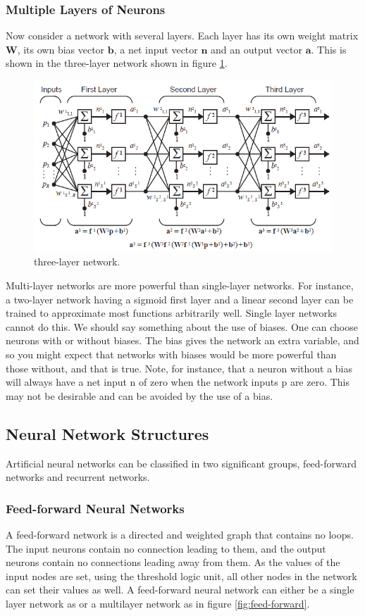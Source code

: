 \documentclass[12pt, a4paper, twoside]{report}
\begin{document}
\subsubsection{Multiple Layers of Neurons}
Now consider a network with several layers. Each layer has its own weight matrix $\mathbf{W}$, its own bias vector $\mathbf{b}$, a net input vector $\mathbf{n}$ and an output vector $\mathbf{a}$. This is shown in the three-layer network shown in figure \ref{fig:three_layer_network}.
\begin{figure}[!h]
	\centering
	\includegraphics[width=1\textwidth]
	{images/chapter4/three_layer_network}
	\caption{three-layer network.}
	\label{fig:three_layer_network}
\end{figure}

Multi-layer networks are more powerful than single-layer networks. For instance, a two-layer network having a sigmoid first layer and a linear second layer can be trained to approximate most functions arbitrarily well. Single layer networks cannot do this. We should say something about the use of biases. One can choose neurons with or without biases. The bias gives the network an extra variable, and so you might expect that networks with biases would be more powerful than those without, and that is true. Note, for instance, that a neuron without a bias will always have a net input n of zero when the network inputs p are zero. This may not be desirable and can be avoided by the use of a bias.

\subsection{Neural Network Structures}
Artificial neural networks can be classified in two significant groups, feed-forward networks and recurrent networks.
\subsubsection{Feed-forward Neural Networks}
A feed-forward network is a directed and weighted graph that contains no loops. The input neurons contain no connection leading to them, and the output neurons contain no connections leading away from them. As the values of the input nodes are set, using the threshold logic unit, all other nodes in the network can set their values as well. A feed-forward neural network can either be a single layer network as or a multilayer network as in figure \ref{fig:feed-forward}.
\end{document}
